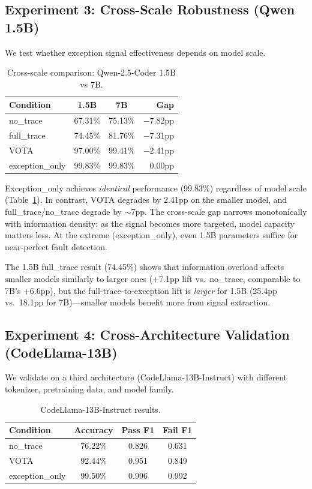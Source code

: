 \documentclass[11pt]{article}
\begin{document}
\subsection{Experiment 3: Cross-Scale Robustness (Qwen 1.5B)}

We test whether exception signal effectiveness depends on model scale.

\begin{table}[h]
\centering
\caption{Cross-scale comparison: Qwen-2.5-Coder 1.5B vs 7B.}
\label{tab:scale}
\begin{tabular}{lccr}
\toprule
Condition & 1.5B & 7B & Gap \\
\midrule
no\_trace & 67.31\% & 75.13\% & $-$7.82pp \\
full\_trace & 74.45\% & 81.76\% & $-$7.31pp \\
VOTA & 97.00\% & 99.41\% & $-$2.41pp \\
exception\_only & 99.83\% & 99.83\% & 0.00pp \\
\bottomrule
\end{tabular}
\end{table}

Exception\_only achieves \emph{identical} performance (99.83\%) regardless of model scale (Table~\ref{tab:scale}). In contrast, VOTA degrades by 2.41pp on the smaller model, and full\_trace/no\_trace degrade by $\sim$7pp. The cross-scale gap narrows monotonically with information density: as the signal becomes more targeted, model capacity matters less. At the extreme (exception\_only), even 1.5B parameters suffice for near-perfect fault detection.

The 1.5B full\_trace result (74.45\%) shows that information overload affects smaller models similarly to larger ones (+7.1pp lift vs.\ no\_trace, comparable to 7B's +6.6pp), but the full-trace-to-exception lift is \emph{larger} for 1.5B (25.4pp vs.\ 18.1pp for 7B)---smaller models benefit more from signal extraction.

\subsection{Experiment 4: Cross-Architecture Validation (CodeLlama-13B)}

We validate on a third architecture (CodeLlama-13B-Instruct) with different tokenizer, pretraining data, and model family.

\begin{table}[h]
\centering
\caption{CodeLlama-13B-Instruct results.}
\label{tab:codellama}
\begin{tabular}{lccc}
\toprule
Condition & Accuracy & Pass F1 & Fail F1 \\
\midrule
no\_trace & 76.22\% & 0.826 & 0.631 \\
VOTA & 92.44\% & 0.951 & 0.849 \\
exception\_only & 99.50\% & 0.996 & 0.992 \\
\bottomrule
\end{tabular}
\end{table}
\end{document}
